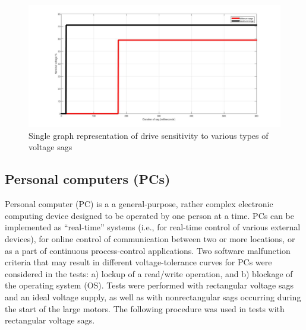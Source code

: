 \documentclass[17pt, a4paper]{extreport}
\begin{document}
 \begin{figure}
     \centering
     \includegraphics[scale=0.3]{asd2.jpg}
     \caption{Single graph representation of drive sensitivity to various types of voltage sags}
     \label{fig:asd_characteristics}
 \end{figure}

\subsection{Personal computers (PCs)} Personal computer (PC) is a a general-purpose, rather complex electronic computing device designed to be operated by one person at a time. PCs can be implemented as “real-time” systems (i.e., for real-time control of various external devices), for online control of communication between two or more locations, or as a part of continuous process-control applications. Two software malfunction criteria that may result in different voltage-tolerance curves for PCs were considered in the tests: a) lockup of a read/write operation, and b) blockage of the operating system (OS). Tests were performed with rectangular voltage sags and an ideal voltage supply, as well as with nonrectangular sags occurring during the start of the large motors. The following procedure was used in tests with rectangular voltage sags.
\end{document}
